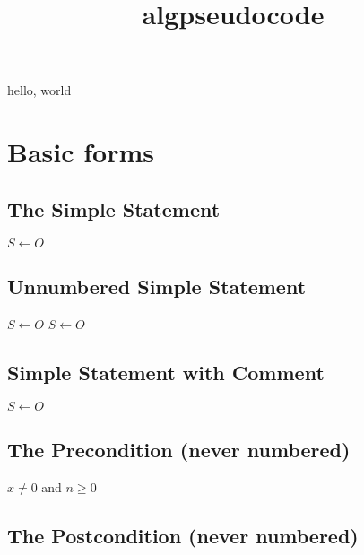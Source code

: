 \documentclass{amsart}
\title{algpseudocode}
\begin{document}
\maketitle

hello, world


\section{Basic forms}

\subsection{The Simple Statement}

\begin{algorithmic}[1]
    \State $S \leftarrow O$
\end{algorithmic}

\subsection{Unnumbered Simple Statement}

\begin{algorithmic}[1]
    \Statex $S \leftarrow O$
    \State  $S \leftarrow O$
\end{algorithmic}

\subsection{Simple Statement with Comment}

\begin{algorithmic}[1]
    \State $S \leftarrow O$ 
\end{algorithmic}

\subsection{The Precondition (never numbered)}

\begin{algorithmic}[1]
    \Require $x \neq 0$ and $n \geq 0$
\end{algorithmic}

\subsection{The Postcondition (never numbered)}
\end{document}
